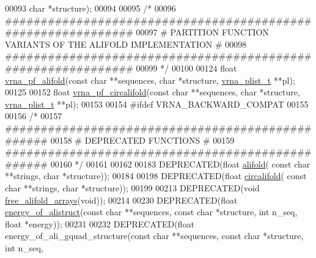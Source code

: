 \begin{DoxyCode}
00093                   \textcolor{keywordtype}{char} *structure);
00094 
00095 \textcolor{comment}{/*}
00096 \textcolor{comment}{#############################################################}
00097 \textcolor{comment}{# PARTITION FUNCTION VARIANTS OF THE ALIFOLD IMPLEMENTATION #}
00098 \textcolor{comment}{#############################################################}
00099 \textcolor{comment}{*/}
00100 
00124 \textcolor{keywordtype}{float} \hyperlink{group__consensus__pf__fold_ga87296fe8e93bb5261783a8db901a5c64}{vrna\_pf\_alifold}(\textcolor{keyword}{const} \textcolor{keywordtype}{char} **sequences, \textcolor{keywordtype}{char} *structure, 
      \hyperlink{group__data__structures_structvrna__plist__s}{vrna\_plist\_t} **pl);
00125 
00152 \textcolor{keywordtype}{float} \hyperlink{group__consensus__pf__fold_ga017209394a4c1e68d96cd47e61d16d25}{vrna\_pf\_circalifold}(\textcolor{keyword}{const} \textcolor{keywordtype}{char} **sequences, \textcolor{keywordtype}{char} *structure, 
      \hyperlink{group__data__structures_structvrna__plist__s}{vrna\_plist\_t} **pl);
00153 
00154 \textcolor{preprocessor}{#ifdef  VRNA\_BACKWARD\_COMPAT}
00155 
00156 \textcolor{comment}{/*}
00157 \textcolor{comment}{#################################################}
00158 \textcolor{comment}{# DEPRECATED FUNCTIONS                          #}
00159 \textcolor{comment}{#################################################}
00160 \textcolor{comment}{*/}
00161 
00162 
00183 DEPRECATED(\textcolor{keywordtype}{float} \hyperlink{group__consensus__mfe__fold_ga4cf00f0659e5f0480335d69e797f05b1}{alifold}( \textcolor{keyword}{const} \textcolor{keywordtype}{char} **strings, \textcolor{keywordtype}{char} *structure));
00184 
00198 DEPRECATED(\textcolor{keywordtype}{float} \hyperlink{group__consensus__mfe__fold_gadbd3b0b1c144cbfb4efe704b2b260f96}{circalifold}( \textcolor{keyword}{const} \textcolor{keywordtype}{char} **strings, \textcolor{keywordtype}{char} *structure));
00199 
00213 DEPRECATED(\textcolor{keywordtype}{void} \hyperlink{group__consensus__mfe__fold_ga72095e4554b5d577250ea14c42acc49e}{free\_alifold\_arrays}(\textcolor{keywordtype}{void}));
00214 
00230 DEPRECATED(\textcolor{keywordtype}{float} \hyperlink{group__consensus__fold_ga1c48869c03b49a342bf4cbdd61900081}{energy\_of\_alistruct}(\textcolor{keyword}{const} \textcolor{keywordtype}{char} **sequences, \textcolor{keyword}{const} \textcolor{keywordtype}{char} *structure, \textcolor{keywordtype}{int} 
      n\_seq, \textcolor{keywordtype}{float} *energy));
00231 
00232 DEPRECATED(\textcolor{keywordtype}{float} energy\_of\_ali\_gquad\_structure(\textcolor{keyword}{const} \textcolor{keywordtype}{char} **sequences, \textcolor{keyword}{const} \textcolor{keywordtype}{char} *structure, \textcolor{keywordtype}{int} n\_seq, \textcolor{keywordtype}{
}
\end{DoxyCode}
